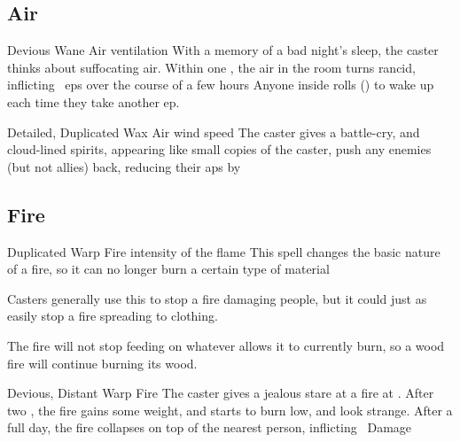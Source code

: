 \begin{multicols}{2}

\subsection{Air}
\label{airSpells}



  {Devious}%
  {Wane}%
  {Air}%
  {ventilation}%
  {With a memory of a bad night's sleep, the caster thinks about suffocating air.
  Within one \showOnset, the air in the room turns rancid, inflicting ~\glspl{ep} over the course of a few hours}%
  {Anyone inside rolls  (\tn[10]) to wake up each time they take another \gls{ep}.}



  {Detailed, Duplicated}%
  {Wax}%
  {Air}%
  {wind speed}%
  {The caster gives a battle-cry, and cloud-lined spirits, appearing like small copies of the caster, push any enemies (but not allies) back, reducing their \glspl{ap} by }%
  {}



\subsection{Fire}
\label{fireSpells}



  {Duplicated}%
  {Warp}%
  {Fire}%
  {intensity of the flame}%
  {This spell changes the basic nature of a fire, so it can no longer burn a certain type of material}%
  {Casters generally use this to stop a fire damaging people, but it could just as easily stop a fire spreading to clothing.

    The fire will not stop feeding on whatever allows it to currently burn, so a wood fire will continue burning its wood.}



  {Devious, Distant}%
  {Warp}%
  {Fire}%
  {}%
  {The caster gives a jealous stare at a fire at \spellRange.
  After two , the fire gains some weight, and starts to burn low, and look strange.
  After a full day, the fire collapses on top of the nearest person, inflicting \showDam~Damage}%
  {}


\end{multicols}
